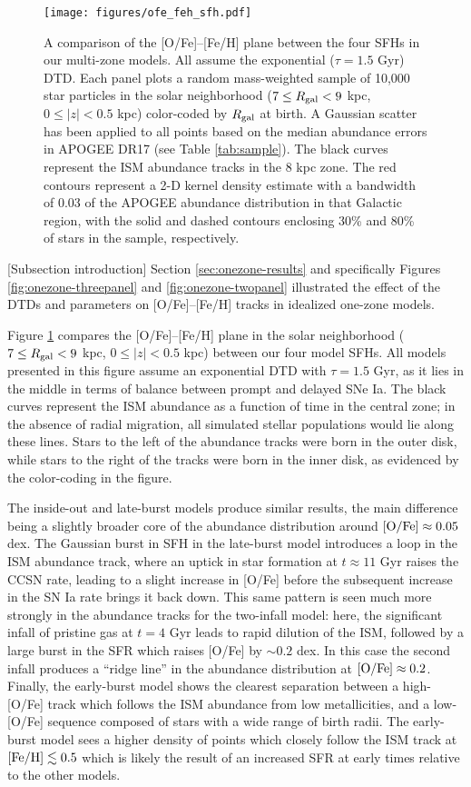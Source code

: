 \documentclass[twocolumn,twocolappendix,linenumbers,trackchanges]{aastex631}
\begin{document}
\begin{figure}
    \centering
    \texttt{[image: figures/ofe\_feh\_sfh.pdf]}
    \caption{A comparison of the [O/Fe]--[Fe/H] plane between the four SFHs in our multi-zone models. All assume the exponential ($\tau=1.5$ Gyr) DTD. Each panel plots a random mass-weighted sample of 10,000 star particles in the solar neighborhood ($7\leq R_{\rm gal}<9$ kpc, $0\leq|z|<0.5$ kpc) color-coded by $R_{\rm gal}$ at birth. A Gaussian scatter has been applied to all points based on the median abundance errors in APOGEE DR17 (see Table \ref{tab:sample}). The black curves represent the ISM abundance tracks in the 8 kpc zone. The red contours represent a 2-D kernel density estimate with a bandwidth of 0.03 of the APOGEE abundance distribution in that Galactic region, with the solid and dashed contours enclosing 30\% and 80\% of stars in the sample, respectively.}
    \label{fig:ofe-feh-sfh}
\end{figure}

[Subsection introduction]
Section \ref{sec:onezone-results} and specifically Figures \ref{fig:onezone-threepanel} and \ref{fig:onezone-twopanel} illustrated the effect of the DTDs and parameters on [O/Fe]--[Fe/H] tracks in idealized one-zone models.

Figure \ref{fig:ofe-feh-sfh} compares the [O/Fe]--[Fe/H] plane in the solar neighborhood ($7\leq R_{\rm gal}<9$ kpc, $0\leq|z|<0.5$ kpc) between our four model SFHs. All models presented in this figure assume an exponential DTD with $\tau=1.5$ Gyr, as it lies in the middle in terms of balance between prompt and delayed SNe Ia. The black curves represent the ISM abundance as a function of time in the central zone; in the absence of radial migration, all simulated stellar populations would lie along these lines. Stars to the left of the abundance tracks were born in the outer disk, while stars to the right of the tracks were born in the inner disk, as evidenced by the color-coding in the figure.

The inside-out and late-burst models produce similar results, the main difference being a slightly broader core of the abundance distribution around ${\rm [O/Fe]}\approx0.05$ dex. The Gaussian burst in SFH in the late-burst model introduces a loop in the ISM abundance track, where an uptick in star formation at $t\approx11$ Gyr raises the CCSN rate, leading to a slight increase in [O/Fe] before the subsequent increase in the SN Ia rate brings it back down. This same pattern is seen much more strongly in the abundance tracks for the two-infall model: here, the significant infall of pristine gas at $t=4$ Gyr leads to rapid dilution of the ISM, followed by a large burst in the SFR which raises [O/Fe] by $\sim 0.2$ dex. In this case the second infall produces a ``ridge line'' in the abundance distribution at ${\rm [O/Fe]}\approx 0.2$. Finally, the early-burst model shows the clearest separation between a high-[O/Fe] track which follows the ISM abundance from low metallicities, and a low-[O/Fe] sequence composed of stars with a wide range of birth radii. The early-burst model sees a higher density of points which closely follow the ISM track at ${\rm [Fe/H]}\lesssim 0.5$ which is likely the result of an increased SFR at early times relative to the other models.
\end{document}
